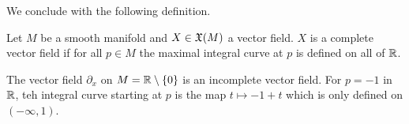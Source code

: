 We conclude with the following definition. 
\begin{definition}\label{def: complete integral curve}
    Let $M$ be a smooth manifold and $X\in\mathfrak{X}(M)$ a vector field. $X$ is a complete vector field if for all $p\in M$ the maximal integral curve at $p$ is defined on all of $\mathbb{R}$. 
\end{definition}
\begin{example}
    The vector field $\partial_{x}$ on $M=\mathbb{R}\setminus\{0\}$ is an incomplete vector field. For $p=-1$ in $\mathbb{R}$, teh integral curve starting at $p$ is the map $t\mapsto-1+t$ which is only defined on $(-\infty,1)$. 
\end{example}